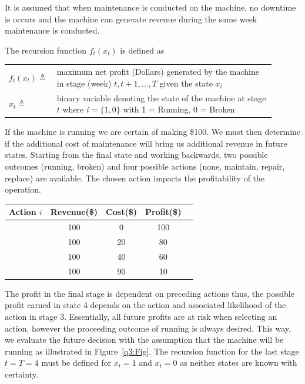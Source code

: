 \documentclass[a4paper,11pt]{article}
\begin{document}
It is assumed that when maintenance is conducted on the machine, no downtime is occurs and the machine can generate revenue during the same week maintenance is conducted.

The recursion function $f_t(x_t)$ is defined as
\vspace{12pt}

\begin{tabular}{p{0.1\linewidth}  p{0.8\linewidth}}
	$f_t(x_t) \triangleq$ & maximum net profit (Dollars) generated by the machine in stage (week) $t,t+1,\dots, T$ given the state $x_i$ \\ 
  	$x_t \triangleq$&  binary variable denoting the state of the machine at stage $t$ where $i =\{1,0\}$ with 1 = Running, 0 = Broken \\
\end{tabular}

\vspace{12pt}

If the machine is running we are certain of making \$100. We must then determine if the additional cost of maintenance will bring us additional revenue in future states. Starting from the final state and working backwards, two possible outcomes (running, broken) and four possible actions (none, maintain, repair, replace) are available. The chosen action impacts the profitability of the operation. 

\begin{table}[h]
	\centering
	\label{q3:revCalc}
	\begin{tabular}{ccccc}
	\hline
		\textbf{Action $i$} & \textbf{Revenue(\$)} & \textbf{Cost(\$)}& \textbf{Profit(\$)}\\
		\hline
		\text{None} &100 & 0 &100\\
		\text{Maintenance} &100 & 20&80\\
		\text{Repair} &100 & 40& 60\\
		\text{Replace} &100 & 90&10\\
		\hline
	\end{tabular}
\end{table}

The profit in the final stage is dependent on preceding actions thus, the possible profit earned in state 4 depends on the action and associated likelihood of the action in stage 3. Essentially, all future profits are at risk when selecting an action, however the proceeding outcome of running is always desired. This way, we evaluate the future decision with the assumption that the machine will be running as illustrated in Figure~\ref{q3:Fig}. The recursion function for the last stage $t=T=4$ must be defined for $x_t=1$ and $x_t=0$ as neither states are known with certainty.
\end{document}
